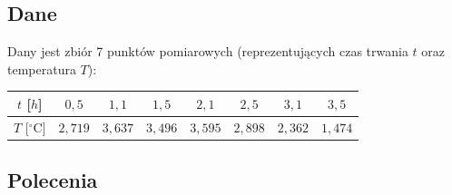 \documentclass[a4paper,11pt]{article}
\begin{document}
\subsection*{Dane}

Dany jest zbiór 7 punktów pomiarowych (reprezentujących czas trwania $t$ oraz temperatura $T$):

\begin{center}
\begin{tabular}{c|ccccccc}
  \toprule
  $t$ [$h$] & $0{,}5$ & $1{,}1$ & $1{,}5$ & $2{,}1$ & $2{,}5$ & $3{,}1$ & $3{,}5$ \\
  \midrule
  $T$ [$^\circ\text{C}$] & $2{,}719$ & $3{,}637$ & $3{,}496$ & $3{,}595$ & $2{,}898$ & $2{,}362$ & $1{,}474$ \\
  \bottomrule
\end{tabular}
\end{center}

\subsection*{Polecenia}
\end{document}
